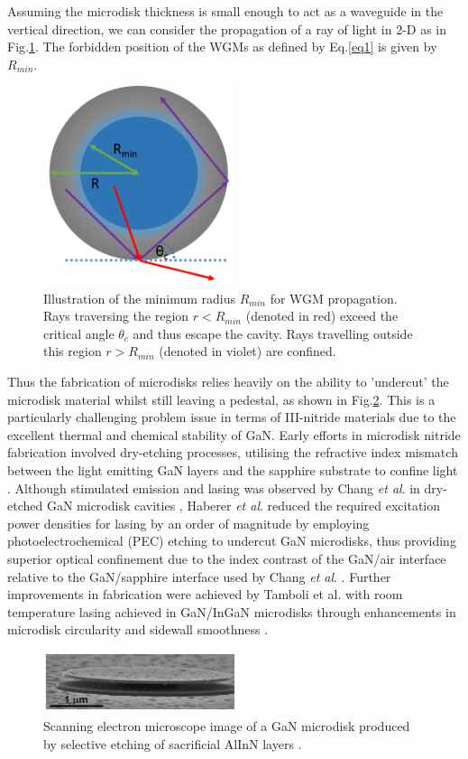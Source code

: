 Assuming the microdisk thickness is small enough to act as a waveguide in the vertical direction, we can consider the propagation of a ray of light in 2-D as in Fig.\ref{1.14}. The forbidden position of the WGMs as defined by Eq.\ref{eq1} is given by $R_{min}$.
\begin{figure}[h]
	\centering
	\includegraphics[width=0.5\textwidth]{Figs/Ch1/mdiskray.png}
	\caption {Illustration of the minimum radius $R_{min}$ for WGM propagation. Rays traversing the region $r<R_{min}$ (denoted in red) exceed the critical angle $\theta_{c}$ and thus escape the cavity. Rays travelling outside this region $r>R_{min}$ (denoted in violet) are confined.  }
	\label{1.14}
\end{figure}
\FloatBarrier 
Thus the fabrication of microdisks relies heavily on the ability to 'undercut' the microdisk material whilst still leaving a pedestal, as shown in Fig.\ref{1.15}. This is a particularly challenging problem issue in terms of III-nitride materials due to the excellent thermal and chemical stability of GaN.  Early efforts in microdisk nitride fabrication involved dry-etching processes, utilising the refractive index mismatch between the light emitting GaN layers and the sapphire substrate to confine light \cite{Tamboli2007}. Although stimulated emission and lasing was observed by Chang {\it et al}. in dry-etched GaN microdisk cavities \cite{Chang1999}, Haberer {\it et al}. \cite{Haberer2004} reduced the required excitation power densities for lasing by an order of magnitude by employing photoelectrochemical (PEC) etching to undercut GaN microdisks, thus providing superior optical confinement due to the index contrast of the GaN/air interface  relative to the GaN/sapphire interface used by Chang {\it et al}. \cite{Chang1999}. Further improvements in fabrication were achieved by Tamboli et al. with room temperature lasing achieved in GaN/InGaN microdisks through enhancements in microdisk circularity and sidewall smoothness \cite{Tamboli2007}. 
\begin{figure}[h]
	\centering
	\includegraphics[width=0.5\textwidth]{Figs/Ch1/mdisksem.png}
	\caption {Scanning electron microscope image of a GaN microdisk produced by selective etching of sacrificial AlInN layers \cite{Simeonov2008}.}
	\label{1.15}
\end{figure}
\FloatBarrier 


